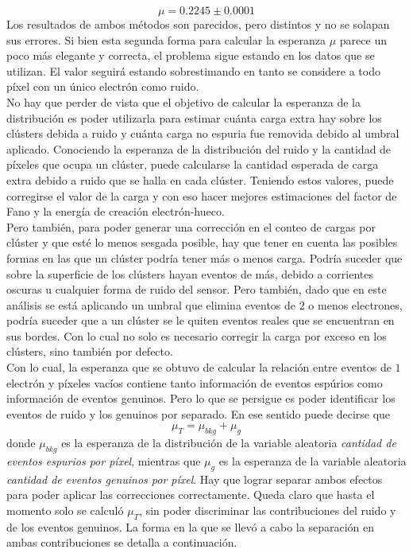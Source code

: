 \begin{equation*}
    \mu = 0.2245 \pm 0.0001
\end{equation*}
Los resultados de ambos métodos son parecidos, pero distintos y no se solapan sus errores. Si bien esta segunda forma para calcular la esperanza $\mu$ parece un poco más elegante y correcta, el problema sigue estando en los datos que se utilizan. El valor seguirá estando sobrestimando en tanto se considere a todo píxel con un único electrón como ruido.\\
\indent No hay que perder de vista que el objetivo de calcular la esperanza de la distribución es poder utilizarla para estimar cuánta carga extra hay sobre los clústers debida a ruido y cuánta carga no espuria fue removida debido al umbral aplicado. Conociendo la esperanza de la distribución del ruido y la cantidad de píxeles que ocupa un clúster, puede calcularse la cantidad esperada de carga extra debido a ruido que se halla en cada clúster. Teniendo estos valores, puede corregirse el valor de la carga y con eso hacer mejores estimaciones del factor de Fano y la energía de creación electrón-hueco.\\
\indent Pero también, para poder generar una corrección en el conteo de cargas por clúster y que esté lo menos sesgada posible, hay que tener en cuenta las posibles formas en las que un clúster podría tener más o menos carga. Podría suceder que sobre la superficie de los clústers hayan eventos de más, debido a corrientes oscuras u cualquier forma de ruido del sensor. Pero también, dado que en este análisis se está aplicando un umbral que elimina eventos de $2$ o menos electrones, podría suceder que a un clúster se le quiten eventos reales que se encuentran en sus bordes. Con lo cual no solo es necesario corregir la carga por exceso en los clústers, sino también por defecto.\\
\indent Con lo cual, la esperanza que se obtuvo de calcular la relación entre eventos de $1$ electrón y píxeles vacíos contiene tanto información de eventos espúrios como información de eventos genuinos. Pero lo que se persigue es poder identificar los eventos de ruido y los genuinos por separado. En ese sentido puede decirse que 
\begin{equation*}
    \mu_{T} = \mu_{bkg} + \mu_{g}
\end{equation*}
donde $\mu_{bkg}$ es la esperanza de la distribución de la variable aleatoria \textit{cantidad de eventos espurios por píxel}, mientras que $\mu_{g}$ es la esperanza de la variable aleatoria \textit{cantidad de eventos genuinos por píxel}. Hay que lograr separar ambos efectos para poder aplicar las correcciones correctamente. Queda claro que hasta el momento solo se calculó $\mu_{T}$, sin poder discriminar las contribuciones del ruido y de los eventos genuinos. La forma en la que se llevó a cabo la separación en ambas contribuciones se detalla a continuación.

